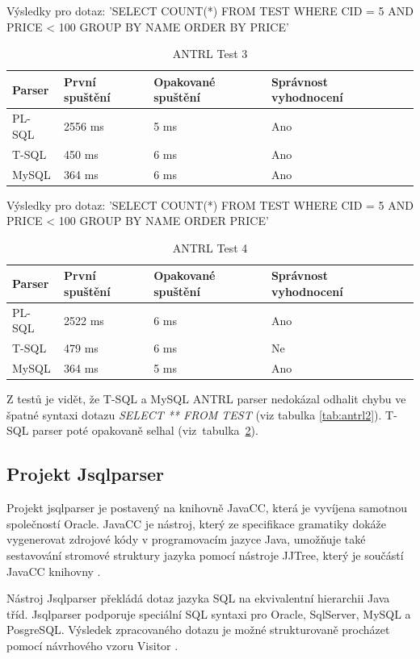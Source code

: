 \documentclass[czech,bachelor,public,dept460,male,cpdeclaration,twoside]{diploma}
\begin{document}
\begin{table}[!htbp]
	\centering
	\caption{ANTRL Test 3}
	Výsledky pro dotaz: 'SELECT COUNT(*) FROM TEST WHERE CID = 5 AND PRICE < 100 GROUP BY NAME ORDER BY PRICE'
	\vskip 0.1cm
	\label{tab:antrl3}
	\begin{tabular}{lllll}
		\toprule
		Parser & První spuštění & Opakované spuštění & Správnost vyhodnocení\\
		\midrule
		PL-SQL & 2556 ms & 5 ms & Ano \\
        T-SQL & 450 ms & 6 ms & Ano \\
        MySQL & 364 ms & 6 ms & Ano \\
		\midrule
	\end{tabular}
\end{table}

\begin{table}[!htbp]
	\centering
	\caption{ANTRL Test 4}
	Výsledky pro dotaz: 'SELECT COUNT(*) FROM TEST WHERE CID = 5 AND PRICE < 100 GROUP BY NAME ORDER PRICE'
	\vskip 0.1cm
	\label{tab:antrl4}
	\begin{tabular}{lllll}
		\toprule
		Parser & První spuštění & Opakované spuštění & Správnost vyhodnocení\\
		\midrule
		PL-SQL & 2522 ms & 6 ms & Ano \\
        T-SQL & 479 ms & 6 ms & Ne \\
        MySQL & 364 ms & 5 ms & Ano \\
		\midrule
	\end{tabular}
\end{table}


Z testů je vidět, že T-SQL a MySQL ANTRL parser nedokázal odhalit chybu ve špatné syntaxi dotazu \textit{SELECT ** FROM TEST} (viz tabulka \ref{tab:antrl2}). T-SQL parser poté opakovaně selhal (viz~tabulka~\ref{tab:antrl4}).



\subsection{Projekt Jsqlparser}
Projekt jsqlparser je postavený na knihovně JavaCC, která je vyvíjena samotnou společností Oracle. JavaCC je nástroj, který ze specifikace gramatiky dokáže vygenerovat zdrojové kódy v programovacím jazyce Java, umožňuje také sestavování stromové struktury jazyka pomocí nástroje JJTree, který je součástí JavaCC knihovny \cite{jsql}.


Nástroj Jsqlparser překládá dotaz jazyka SQL na ekvivalentní hierarchii Java tříd. Jsqlparser podporuje speciální SQL syntaxi pro Oracle, SqlServer, MySQL a PosgreSQL. Výsledek zpracovaného dotazu je možné strukturovaně procházet pomocí návrhového vzoru Visitor \cite{jsqld}.
\end{document}
